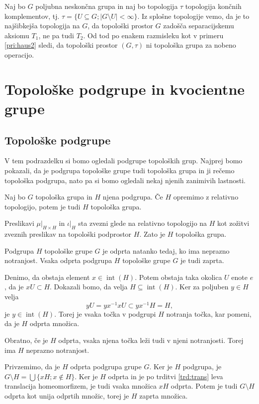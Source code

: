 \documentclass[mat1]{fmfdelo}
\DeclareMathOperator{\interior}{int}
\begin{document}
\begin{primer}
Naj bo $G$ poljubna neskončna grupa in naj bo topologija $\tau$ topologija končnih komplementov, tj. $\tau = \lbrace U \subseteq G ; |G\setminus U| < \infty \rbrace$.
Iz splošne topologije vemo, da je to najšibkejša topologija na $G$, da topološki prostor $G$ zadošča separacijskemu aksiomu $T_1$, ne pa tudi $T_2$. Od tod po enakem razmisleku kot v primeru \ref{pri:haus2} sledi, da topološki prostor $(G, \tau)$ ni topološka grupa za nobeno operacijo.
\end{primer}

\section{Topološke podgrupe in kvocientne grupe}

\subsection{Topološke podgrupe}
V tem podrazdelku si bomo ogledali podgrupe topoloških grup. Najprej bomo pokazali, da je podgrupa topološke grupe tudi topološka grupa in ji rečemo topološka podgrupa, nato pa si bomo ogledali nekaj njenih zanimivih lastnosti.
\begin{trditev}\label{trd:toppodgrupa}
Naj bo $G$ topološka grupa in $H$ njena podgrupa. Če $H$ opremimo z relativno topologijo, potem je tudi $H$ topološka grupa.
\end{trditev}

\begin{dokaz}
Preslikavi $\mu|_{H \times H}$ in $\iota|_H$ sta zvezni glede na relativno topologijo na $H$ kot zožitvi zveznih preslikav na topološki podprostor $H$. Zato je $H$ topološka grupa.
\end{dokaz}


\begin{trditev}\label{trd:odpzap}
Podgrupa $H$ topološke grupe $G$ je odprta natanko tedaj, ko ima ne\-praz\-no not\-ran\-jost. Vsaka odprta podgrupa $H$ topološke grupe $G$ je tudi zaprta.
\end{trditev}

\begin{dokaz}
Denimo, da obstaja element $x \in \interior(H)$. Potem obstaja taka okolica $U$ enote $e$, da je $xU \subset H$. Dokazali bomo, da velja $H \subseteq \interior(H)$. Ker za poljuben $y \in H$ velja \[yU = yx^{-1}xU \subset yx^{-1}H = H,\] je $y \in \interior(H)$. Torej je vsaka točka v podgrupi $H$ notranja točka, kar pomeni, da je $H$ odprta množica.

Obratno, če je $H$ odprta, vsaka njena točka leži tudi v njeni notranjosti. Torej ima $H$ neprazno notranjost.

Privzemimo, da je $H$ odprta podgrupa grupe $G$. Ker je $H$ podgrupa, je $G\setminus H = \bigcup \lbrace xH ; x \notin H \rbrace$. Ker je $H$ odprta in je po trditvi \ref{trd:trans} leva translacija homeomorfizem, je tudi vsaka množica $xH$ odprta. Potem je tudi $G \setminus H$ odprta kot unija odprtih množic, torej je $H$ zaprta množica.
\end{dokaz}
\end{document}
